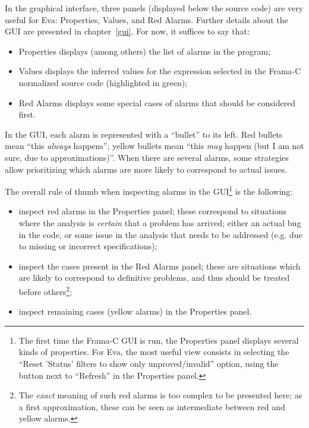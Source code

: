 \documentclass[web]{frama-c-book}
\newcommand{\Eva}{\textsf{Eva}}
\begin{document}
In the graphical interface, three panels (displayed below the
source code) are very useful for \Eva{}: Properties, Values, and
Red Alarms. Further details about the GUI are presented in chapter~\ref{gui}.
For now, it suffices to say that:

\begin{itemize}
\item Properties displays (among others) the list of alarms in the program;
\item Values displays the inferred values for the expression selected in the
  Frama-C normalized source code (highlighted in green);
\item Red Alarms displays some special cases of alarms that should be considered
  first.
\end{itemize}

In the GUI, each alarm is represented with a ``bullet'' to its left.
Red bullets mean ``this {\em always} happens''; yellow
bullets mean ``this {\em may} happen (but I am not sure, due to
approximations)''. When there are several alarms, some strategies allow
prioritizing which alarms are more likely to correspond to actual issues.

The overall rule of thumb when inspecting alarms in the GUI\footnote{The first
  time the Frama-C GUI is run, the Properties panel displays several kinds of
  properties. For \Eva{}, the most useful view consists in selecting the
  ``Reset 'Status' filters to show only unproved/invalid'' option, using the
  button next to ``Refresh'' in the Properties panel.} is the following:

\begin{itemize}
\item inspect red alarms in the Properties panel; these correspond to
  situations where the analysis is {\em certain} that a problem has arrived;
  either an actual bug in the code, or some issue in the analysis that needs to
  be addressed (e.g. due to missing or incorrect specifications);
\item inspect the cases present in the Red Alarms panel; these are situations
  which are likely to correspond to definitive problems, and thus should be
  treated before others\footnote{The {\em exact} meaning of such red alarms is
    too complex to be presented here; as a first approximation, these can be
    seen as intermediate between red and yellow alarms.};
\item inspect remaining cases (yellow alarms) in the Properties panel.
\end{itemize}
\end{document}
